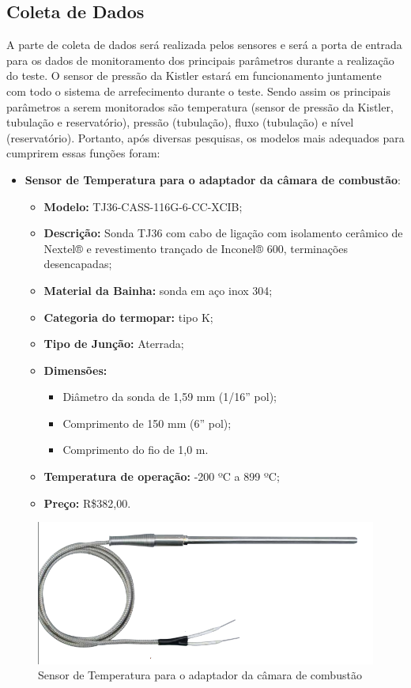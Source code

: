 \subsection{Coleta de Dados}
A parte de coleta de dados será realizada pelos sensores e será a porta de entrada para os dados de monitoramento dos principais parâmetros durante a realização do teste. O sensor de pressão da Kistler estará em funcionamento juntamente com todo o sistema de arrefecimento durante o teste. Sendo assim os principais parâmetros a serem monitorados são temperatura (sensor de pressão da Kistler, tubulação e reservatório), pressão (tubulação), fluxo (tubulação) e nível (reservatório). Portanto, após diversas pesquisas, os modelos mais adequados para cumprirem essas funções foram:
\begin{itemize}
	\item \textbf{Sensor de Temperatura para o adaptador da câmara de combustão}:
	\begin{itemize}
		\item \textbf{Modelo:} TJ36-CASS-116G-6-CC-XCIB;
		\item\textbf{Descrição:} Sonda TJ36 com cabo de ligação com isolamento cerâmico de Nextel® e revestimento trançado de Inconel® 600, terminações desencapadas;
		\item\textbf{Material da Bainha:} sonda em aço inox 304;
		\item\textbf{Categoria do termopar:} tipo K;
		\item\textbf{Tipo de Junção:} Aterrada;
		\item\textbf{Dimensões:}
		\begin{itemize}
			\item  Diâmetro da sonda de 1,59 mm (1/16” pol);
			\item Comprimento de 150 mm (6” pol);
			\item Comprimento do fio de 1,0 m.
		\end{itemize}
		\item \textbf{Temperatura de operação:} -200 ºC a 899 ºC;
		\item \textbf{Preço:} R\$382,00.
	\end{itemize}
	
\end{itemize}
\begin{figure}[!htb]                   
	\centering                          
	\includegraphics[scale=0.4]{figuras/Sensor1.png}
	\caption{Sensor de Temperatura para o adaptador da câmara de combustão}               
\end{figure}
